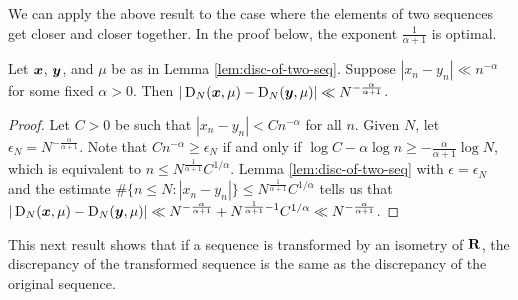 We can apply the above result to the case where the elements of two sequences 
get closer and closer together. In the proof below, the exponent 
$\frac{1}{\alpha+1}$ is optimal. 

\begin{corollary}\label{cor:close-seq-disc}
Let ${\boldsymbol x}$, ${\boldsymbol y}$, and $\mu$ be as in Lemma \ref{lem:disc-of-two-seq}. Suppose 
$|x_n - y_n| \ll n^{-\alpha}$ for some fixed $\alpha>0$. Then 
$|\operatorname{D}_N({\boldsymbol x},\mu) - \operatorname{D}_N({\boldsymbol y},\mu)| \ll N^{-\frac{\alpha}{\alpha+1}}$. 
\end{corollary}
\begin{proof}
Let $C>0$ be such that $|x_n - y_n| < C n^{-\alpha}$ for all $n$. Given 
$N$, let $\epsilon_N = N^{-\frac{\alpha}{\alpha+1}}$. Note that 
$C n^{-\alpha} \geqslant \epsilon_N$ if and only if 
$\log C - \alpha\log n \geqslant -\frac{\alpha}{\alpha+1} \log N$, which is 
equivalent to $n \leqslant N^{\frac{1}{\alpha+1}} C^{1/\alpha}$. 
Lemma \ref{lem:disc-of-two-seq} with $\epsilon = \epsilon_N$ and the estimate 
$\# \{n\leqslant N : |x_n - y_n|\} \leqslant N^{\frac{1}{\alpha+1}} C^{1/\alpha}$ 
tells us that 
$|\operatorname{D}_N({\boldsymbol x},\mu) - \operatorname{D}_N({\boldsymbol y},\mu)| \ll N^{-\frac{\alpha}{\alpha+1}} + N^{\frac{1}{\alpha+1} - 1} C^{1/\alpha}\ll N^{-\frac{\alpha}{\alpha+1}}$. 
\end{proof}

This next result shows that if a sequence is transformed by an isometry of 
$\mathbf{R}$, the discrepancy of the transformed sequence is the same as the 
discrepancy of the original sequence.

